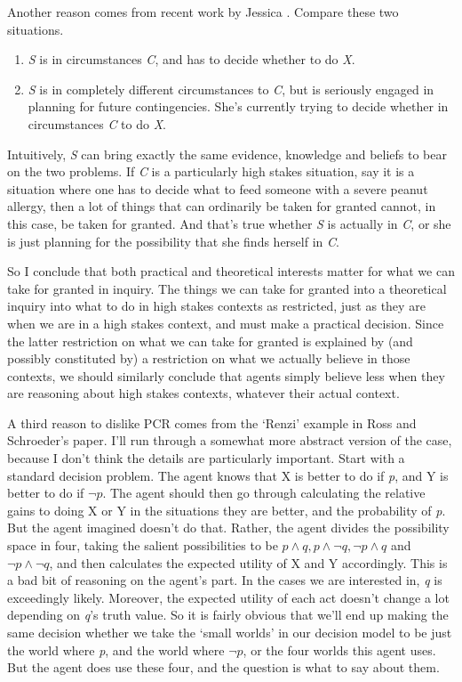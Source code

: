Another reason comes from recent work by Jessica \citet{Brown2013}. Compare these two situations.

\begin{enumerate}
\item \emph{S} is in circumstances \emph{C}, and has to decide whether to do \emph{X}.

\item \emph{S} is in completely different circumstances to \emph{C}, but is seriously engaged in planning for future contingencies. She's currently trying to decide whether in circumstances \emph{C} to do \emph{X}.

\end{enumerate}
Intuitively, \emph{S} can bring exactly the same evidence, knowledge and beliefs to bear on the two problems. If \emph{C} is a particularly high stakes situation, say it is a situation where one has to decide what to feed someone with a severe peanut allergy, then a lot of things that can ordinarily be taken for granted cannot, in this case, be taken for granted. And that's true whether \emph{S} is actually in \emph{C}, or she is just planning for the possibility that she finds herself in \emph{C}.

So I conclude that both practical and theoretical interests matter for what we can take for granted in inquiry. The things we can take for granted into a theoretical inquiry into what to do in high stakes contexts as restricted, just as they are when we are in a high stakes context, and must make a practical decision. Since the latter restriction on what we can take for granted is explained by (and possibly constituted by) a restriction on what we actually believe in those contexts, we should similarly conclude that agents simply believe less when they are reasoning about high stakes contexts, whatever their actual context.

A third reason to dislike PCR comes from the `Renzi' example in Ross and Schroeder's paper. I'll run through a somewhat more abstract version of the case, because I don't think the details are particularly important. Start with a standard decision problem. The agent knows that X is better to do if \emph{p}, and Y is better to do if $\neg p$. The agent should then go through calculating the relative gains to doing X or Y in the situations they are better, and the probability of \emph{p}. But the agent imagined doesn't do that. Rather, the agent divides the possibility space in four, taking the salient possibilities to be $p \wedge q, p \wedge \neg q, \neg p \wedge q$ and $\neg p \wedge \neg q$, and then calculates the expected utility of X and Y accordingly. This is a bad bit of reasoning on the agent's part. In the cases we are interested in, \emph{q} is exceedingly likely. Moreover, the expected utility of each act doesn't change a lot depending on \emph{q}'s truth value. So it is fairly obvious that we'll end up making the same decision whether we take the `small worlds' in our decision model to be just the world where \emph{p}, and the world where $\neg p$, or the four worlds this agent uses. But the agent does use these four, and the question is what to say about them.

